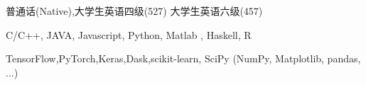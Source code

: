 
\begin{cvtbl}
        {普通话(Native),大学生英语四级(527) 大学生英语六级(457)}%

        {C/C++, JAVA, Javascript, Python, Matlab , Haskell, R}

        {TensorFlow,PyTorch,Keras,Dask,scikit-learn, SciPy (NumPy, Matplotlib, pandas, ...)}

\end{cvtbl}

\endinput
